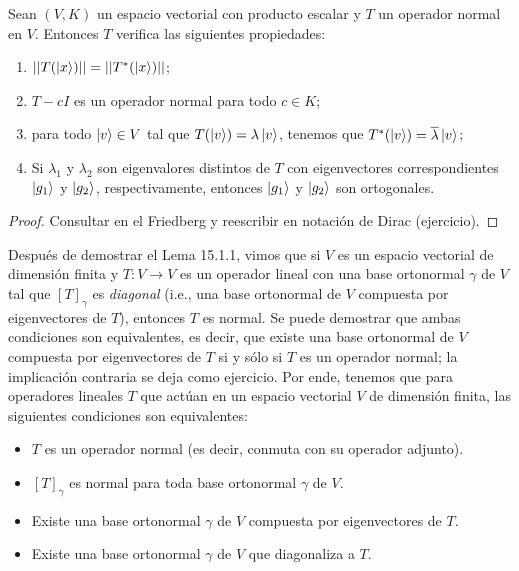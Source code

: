 \documentclass[12pt,dvipsnames]{article}
\newenvironment{teorema}[2][Teorema]{\begin{trivlist}
\item[\hskip \labelsep {\bfseries #1}\hskip \labelsep {\bfseries #2.}]}{\end{trivlist}}
\begin{document}
\begin{teorema} {15.1.2}
    Sean $(V,K)$ un espacio vectorial con producto escalar y $T$ un operador normal en $V$. Entonces $T$ verifica las siguientes propiedades:

\begin{enumerate}[label=(\alph*)]
    \item $||T(\ket{x})||=||T^*(\ket{x})||$;
    \item $T-cI$ es un operador normal para todo $c\in K$;
    \item para todo $\ket{v}\in V$ tal que $T(\ket{v})=\lambda \ket{v}$, tenemos que $T^*(\ket{v})=\overline{\lambda}\ket{v}$;
    \item Si $\lambda_1$ y $\lambda_2$ son eigenvalores distintos de $T$ con eigenvectores correspondientes $\ket{g_1}$ y $\ket{g_2}$, respectivamente, entonces $\ket{g_1}$ y $\ket{g_2}$ son ortogonales.
\end{enumerate}

\begin{proof}
    Consultar en el Friedberg y reescribir en notación de Dirac (ejercicio).

    \iffalse


    (a)

    \vspace{3mm}
    (b)

    \vspace{3mm}
    (c) 

    \vspace{3mm}
    (d)


    \fi


\end{proof}
\end{teorema}

\vspace{3mm}
Después de demostrar el Lema 15.1.1, vimos que si $V$ es un espacio vectorial de dimensión finita y $T:V\to V$ es un operador lineal con una base ortonormal $\gamma$ de $V$ tal que $[T]_\gamma$ es \emph{diagonal} (i.e., una base ortonormal de $V$ compuesta por eigenvectores de $T$), entonces $T$ es normal. Se puede demostrar que ambas condiciones son equivalentes, es decir, que existe una base ortonormal de $V$ compuesta por eigenvectores de $T$ si y sólo si $T$ es un operador normal; la implicación contraria se deja como ejercicio. Por ende, tenemos que para operadores lineales $T$ que actúan en un espacio vectorial $V$ de dimensión finita, las siguientes condiciones son equivalentes:

\begin{itemize}
    \item $T$ es un operador normal (es decir, conmuta con su operador adjunto).
    \item $[T]_\gamma$ es normal para toda base ortonormal $\gamma$ de $V$. 
    \item Existe una base ortonormal $\gamma$ de $V$ compuesta por eigenvectores de $T$.
    \item Existe una base ortonormal $\gamma$ de $V$ que diagonaliza a $T$.
\end{itemize}
\end{document}
